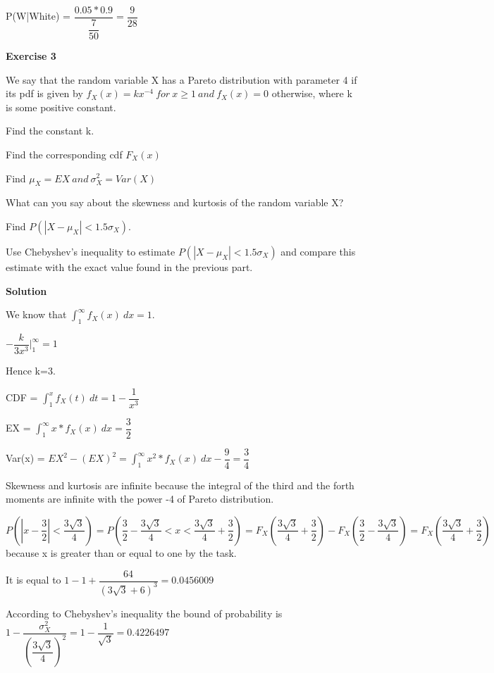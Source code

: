 \documentclass[12pt]{article}
\begin{document}
P(W|White) = $\dfrac{0.05 * 0.9}{\dfrac{7}{50}}=\dfrac{9}{28	}$ 

\bigskip

\textbf{Exercise 3}

We say that the random variable X has a Pareto distribution with parameter 4 if its pdf is given by $f_X(x)=kx^{-4}\ for\ x \geq 1\ and\ f_X(x)=0$ otherwise, where k is some positive constant.

\begin{list}{()~}{}
\item 
Find the constant k.
\item
Find the corresponding cdf $F_X(x)$
\item
Find $\mu_X = EX\ and\ \sigma^2_X = Var(X)$
\item
What can you say about the skewness and kurtosis of the random
variable X?
\item
Find $P(|X-\mu_X| < 1.5 \sigma_X).$
\item
Use Chebyshev’s inequality to estimate $P(|X-\mu_X| < 1.5 \sigma_X)$ and compare this estimate with the exact value found in the previous part.
\end{list}

\medskip		

\textbf{Solution}

\begin{list}{()~}{}
\item
We know that $\int^{\infty}_{1}f_X(x)\ dx=1$.

$-\dfrac{k}{3x^3} \vert ^{\infty}_1=1$

Hence k=3.
\item
CDF = $\int^{x}_{1}f_X(t)\ dt = 1 - \dfrac{1}{x^3}$ 
\item
EX = $\int^{\infty}_{1}x*f_X(x)\ dx = \dfrac{3}{2}$

Var(x) = $EX^2 - (EX)^2= \int^{\infty}_{1}x^2*f_X(x)\ dx - \dfrac{9}{4} = \dfrac{3}{4}$
\item
Skewness and kurtosis are infinite because the integral of the third and the forth moments are infinite with the power -4 of Pareto distribution.
\item
$P(|x-\dfrac{3}{2}|<\dfrac{3\sqrt{3}}{4})=P(\dfrac{3}{2} - \dfrac{3\sqrt{3}}{4}<x<\dfrac{3\sqrt{3}}{4} + \dfrac{3}{2})=F_X(\dfrac{3\sqrt{3}}{4} + \dfrac{3}{2})-F_X(\dfrac{3}{2} - \dfrac{3\sqrt{3}}{4})=F_X(\dfrac{3\sqrt{3}}{4} + \dfrac{3}{2})$ because x is greater than or equal to one by the task.

It is equal to $1-1+\dfrac{64}{(3\sqrt{3}+6)^3}=0.0456009$
\item
According to Chebyshev's inequality the bound of probability is $1 - \dfrac{\sigma^2_X}{(\dfrac{3\sqrt{3}}{4})^2} = 1 - \dfrac{1}{\sqrt{3}}=0.4226497$ 
\end{list}
\end{document}

